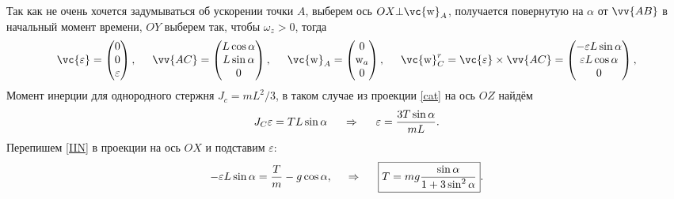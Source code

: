 Так как не очень хочется задумываться об ускорении точки $A$, выберем ось $OX \bot \vc{\mathrm{w}}_A$, получается повернутую на $\alpha$ от $\vv{AB}$ в начальный момент времени, $OY$ выберем так, чтобы $\omega_z > 0$, тогда
$$
    \vc{\varepsilon} = \begin{pmatrix}
        0 \\ 0 \\ \varepsilon
    \end{pmatrix},
    \hspace{0.5cm} 
    \vv{AC} = \begin{pmatrix}
        L \cos \alpha \\ L \sin \alpha \\ 0
    \end{pmatrix},
    \hspace{0.5cm} 
    \vc{\mathrm{w}}_A = \begin{pmatrix}
        0 \\ {\mathrm{w}}_a \\ 0
    \end{pmatrix},
    \hspace{0.5cm} 
    \vc{\mathrm{w}}_C^r = \vc{\varepsilon} \times \vv{AC} = \begin{pmatrix}
        - \varepsilon L \sin \alpha \\
        \varepsilon L \cos \alpha \\
        0
    \end{pmatrix},
$$
Момент инерции для однородного стержня $J_c = m L^2 / 3$, в таком случае из проекции \eqref{cat} на ось $OZ$ найдём
\begin{equation}
    J_C \varepsilon = T L \sin \alpha
    \hspace{0.5cm} \Rightarrow \hspace{0.5cm} 
    \varepsilon = \frac{3T\sin\alpha}{mL}.
\end{equation}
Перепишем \eqref{IIN} в проекции на ось $OX$ и подставим $\varepsilon$:
$$
    - \varepsilon L \sin \alpha = \frac{T}{m} - g \cos \alpha,
    \hspace{0.5cm} \Rightarrow \hspace{0.5cm} 
    \boxed{
        T = mg \frac{\sin \alpha}{1 + 3 \sin^2 \alpha} 
    }.
$$